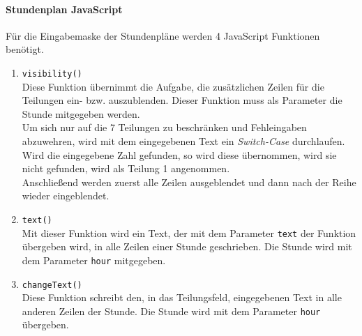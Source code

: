 \paragraph{Stundenplan JavaScript} $ ~~ $\\ \label{sec:content_imple_input_java_lessons}
Für die Eingabemaske der Stundenpläne werden 4 JavaScript Funktionen benötigt.
\begin{enumerate}
	\item \texttt{visibility()}\\
	Diese Funktion übernimmt die Aufgabe, die zusätzlichen Zeilen für die Teilungen ein- bzw. auszublenden. Dieser Funktion muss als Parameter die Stunde mitgegeben werden.\\
	Um sich nur auf die 7 Teilungen zu beschränken und Fehleingaben abzuwehren, wird mit dem eingegebenen Text ein \textit{Switch-Case} durchlaufen. Wird die eingegebene Zahl gefunden, so wird diese übernommen, wird sie nicht gefunden, wird als Teilung 1 angenommen.\\
	Anschließend werden zuerst alle Zeilen ausgeblendet und dann nach der Reihe wieder eingeblendet.
	
	
	
	\item \texttt{text()}\\
	Mit dieser Funktion wird ein Text, der mit dem Parameter \texttt{text} der Funktion übergeben wird, in alle Zeilen einer Stunde geschrieben. Die Stunde wird mit dem Parameter \texttt{hour} mitgegeben.
	
	
	
	\item \texttt{changeText()}\\
	Diese Funktion schreibt den, in das Teilungsfeld, eingegebenen Text in alle anderen Zeilen der Stunde. Die Stunde wird mit dem Parameter \texttt{hour} übergeben.
	
	
	

\end{enumerate}
